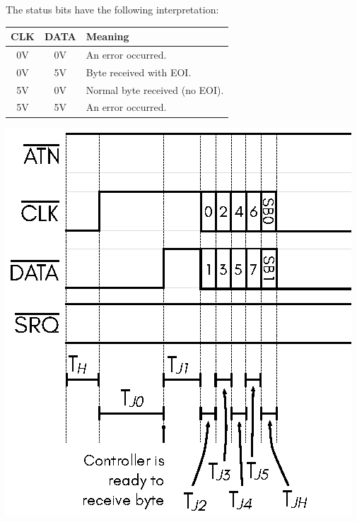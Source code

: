 The status bits have the following interpretation:

\begin{center}
    \begin{longtable}{|c|c|L{6cm}|}
      \hline
        \textbf{CLK} & \textbf{DATA} & \textbf{Meaning} \\
        \hline
        \endhead
        0V & 0V & An error occurred. \\ 
        \hline
        0V & 5V & Byte received with EOI. \\
        \hline
        5V & 0V & Normal byte received (no EOI). \\
        \hline
        5V & 5V & An error occurred. \\
        \hline
    \end{longtable}
\end{center}

\begin{center}
\includegraphics{images/IEC-Timing-Diagrams/IEC-Timing-Diagram-Receive-Byte-JD}
\end{center}

